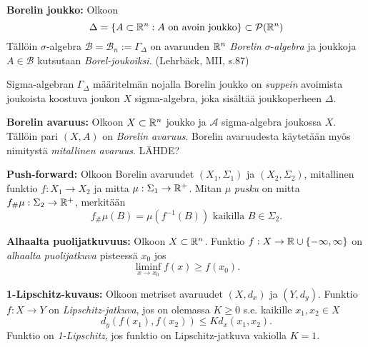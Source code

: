 \begin{definition}
    \textbf{Borelin joukko:}
    Olkoon
    \[\Delta = \{A \subset \mathbb{R}^n : A \text{ on avoin joukko}\} \subset \mathcal{P}(\mathbb{R}^n) \]
    Tällöin $\sigma$-algebra $\mathcal B = \mathcal B_n := \Gamma_\Delta$ on avaruuden $\mathbb{R}^n$ \textit{Borelin} $\sigma$-\textit{algebra} ja joukkoja $A\in \mathcal B$ kutsutaan \textit{Borel-joukoiksi.} 
    (Lehrbäck, MII, s.87)
\end{definition}

Sigma-algebran $\Gamma_\Delta$ määritelmän nojalla Borelin joukko on \textit{suppein} avoimista joukoista koostuva joukon $X$ sigma-algebra, joka sisältää joukkoperheen $\Delta$.



\begin{definition}
    \textbf{Borelin avaruus:} Olkoon $X\subset \mathbb{R}^n$ joukko ja $\mathcal A$ sigma-algebra joukossa $X$. Tällöin pari $(X, A)$ on \textit{Borelin avaruus}. Borelin avaruudesta käytetään myös nimitystä \textit{mitallinen avaruus}. LÄHDE?
\end{definition}

\begin{definition}
    \textbf{Push-forward:} Olkoon Borelin avaruudet $(X_1, \Sigma_1)$ ja $(X_2, \Sigma_2)$, mitallinen funktio $f:X_1 \to X_2$ ja mitta $\mu: \Sigma_1 \to \mathbb{R}^+$. Mitan $\mu$ \textit{pusku} on mitta $f_\#\mu: \Sigma_2 \to \mathbb{R}^+$, merkitään
    $$f_\# \mu (B) = \mu(f^{-1}(B)) \text{ kaikilla } B\in \Sigma_2.$$
\end{definition}

\begin{definition}
    \textbf{Alhaalta puolijatkuvuus:} Olkoon $X\subset \mathbb{R}^n$. Funktio $f: X \to \mathbb{R} \cup\{-\infty, \infty\}$ on \textit{alhaalta puolijatkuva} pisteessä $x_0$ jos 
    $$\liminf_{x\to x_0}  f(x) \ge f(x_0).$$
\end{definition}

\begin{definition}
    \textbf{1-Lipschitz-kuvaus:} Olkoon metriset avaruudet $(X, d_x)$ ja $(Y, d_y)$. Funktio $f:X\to Y$ on \textit{Lipschitz-jatkuva}, jos on olemassa $K\ge 0$ s.e. kaikille $x_1,x_2 \in X$
    $$d_y(f(x_1),f(x_2)) \le Kd_x(x_1,x_2).$$
    Funktio on \textit{1-Lipschitz}, jos funktio on Lipschitz-jatkuva vakiolla $K=1$.
\end{definition}

